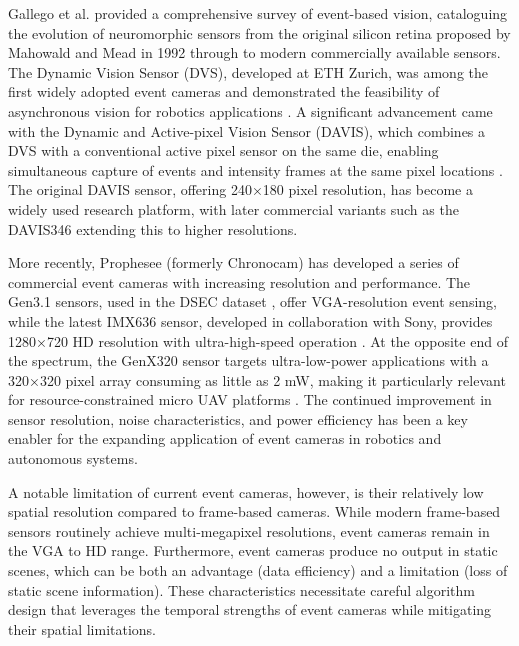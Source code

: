 \documentclass[11pt, a4paper]{report}
\begin{document}
Gallego et al. \cite{gallego2020event} provided a comprehensive survey of event-based vision, cataloguing the evolution of neuromorphic sensors from the original silicon retina proposed by Mahowald and Mead in 1992 through to modern commercially available sensors. The Dynamic Vision Sensor (DVS), developed at ETH Zurich, was among the first widely adopted event cameras and demonstrated the feasibility of asynchronous vision for robotics applications \cite{lichtsteiner2008128x128}. A significant advancement came with the Dynamic and Active-pixel Vision Sensor (DAVIS), which combines a DVS with a conventional active pixel sensor on the same die, enabling simultaneous capture of events and intensity frames at the same pixel locations \cite{brandli2014240x180}. The original DAVIS sensor, offering 240×180 pixel resolution, has become a widely used research platform, with later commercial variants such as the DAVIS346 extending this to higher resolutions. 

More recently, Prophesee (formerly Chronocam) has developed a series of commercial event cameras with increasing resolution and performance. The Gen3.1 sensors, used in the DSEC dataset \cite{gehrig2021dsec}, offer VGA-resolution event sensing, while the latest IMX636 sensor, developed in collaboration with Sony, provides 1280×720 HD resolution with ultra-high-speed operation \cite{prophesee2026metavision}. At the opposite end of the spectrum, the GenX320 sensor targets ultra-low-power applications with a 320×320 pixel array consuming as little as 2 mW, making it particularly relevant for resource-constrained micro UAV platforms \cite{prophesee2026metavision}. The continued improvement in sensor resolution, noise characteristics, and power efficiency has been a key enabler for the expanding application of event cameras in robotics and autonomous systems. 

A notable limitation of current event cameras, however, is their relatively low spatial resolution compared to frame-based cameras. While modern frame-based sensors routinely achieve multi-megapixel resolutions, event cameras remain in the VGA to HD range. Furthermore, event cameras produce no output in static scenes, which can be both an advantage (data efficiency) and a limitation (loss of static scene information). These characteristics necessitate careful algorithm design that leverages the temporal strengths of event cameras while mitigating their spatial limitations.
\end{document}
